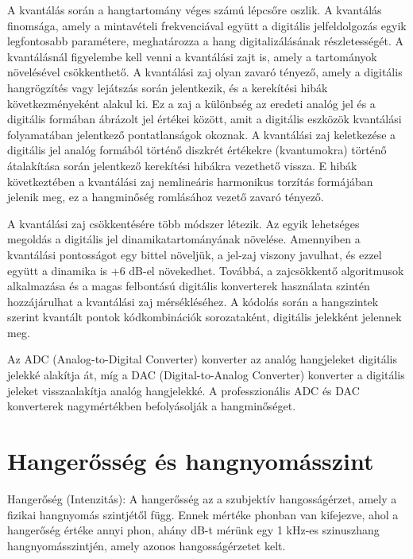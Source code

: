 A kvantálás során a hangtartomány véges számú lépcsőre oszlik. 
A kvantálás finomsága, amely a mintavételi frekvenciával együtt a digitális jelfeldolgozás 
egyik legfontosabb paramétere, meghatározza a hang digitalizálásának részletességét. 
A kvantálásnál figyelembe kell venni a kvantálási zajt is, amely a tartományok növelésével csökkenthető.
A kvantálási zaj olyan zavaró tényező, amely a digitális hangrögzítés vagy lejátszás során jelentkezik, 
és a kerekítési hibák következményeként alakul ki. Ez a zaj a különbség az eredeti analóg jel és a 
digitális formában ábrázolt jel értékei között, amit a digitális eszközök kvantálási folyamatában jelentkező pontatlanságok okoznak.
A kvantálási zaj keletkezése a digitális jel analóg formából történő diszkrét értékekre (kvantumokra) 
történő átalakítása során jelentkező kerekítési hibákra vezethető vissza. 
E hibák következtében a kvantálási zaj nemlineáris harmonikus torzítás formájában jelenik meg, ez a hangminőség romlásához vezető zavaró tényező.

A kvantálási zaj csökkentésére több módszer létezik. Az egyik lehetséges megoldás a 
digitális jel dinamikatartományának növelése. Amennyiben a kvantálási pontosságot 
egy bittel növeljük, a jel-zaj viszony javulhat, és ezzel együtt a dinamika is +6 dB-el növekedhet. 
Továbbá, a zajcsökkentő algoritmusok alkalmazása és a magas felbontású digitális konverterek használata szintén hozzájárulhat a kvantálási zaj mérsékléséhez.
A kódolás során a hangszintek szerint kvantált pontok kódkombinációk sorozataként, digitális jelekként jelennek meg.

Az ADC (Analog-to-Digital Converter) konverter az analóg hangjeleket digitális jelekké alakítja át, míg a DAC (Digital-to-Analog Converter) 
konverter a digitális jeleket visszaalakítja analóg hangjelekké. 
A professzionális ADC és DAC konverterek nagymértékben befolyásolják a hangminőséget.
\section{Hangerősség és hangnyomásszint} %
Hangerőség (Intenzitás):
A hangerősség az a szubjektív hangosságérzet, amely a fizikai hangnyomás szintjétől függ. 
Ennek mértéke phonban van kifejezve, ahol a hangerőség értéke annyi phon, ahány dB-t mérünk 
egy 1 kHz-es szinuszhang hangnyomásszintjén, amely azonos hangosságérzetet kelt.

